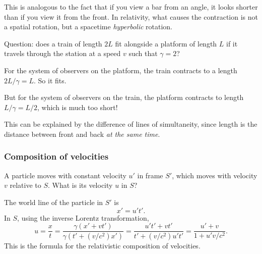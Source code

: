 \documentclass[a4paper]{article}
\begin{document}
This is analogous to the fact that if you view a bar from an angle, it looks shorter than if you view it from the front. In relativity, what causes the contraction is not a spatial rotation, but a spacetime \emph{hyperbolic} rotation.

Question: does a train of length $2L$ fit alongside a platform of length $L$ if it travels through the station at a speed $v$ such that $\gamma = 2$?

For the system of observers on the platform, the train contracts to a length $2L/\gamma = L$. So it fits.

But for the system of observers on the train, the platform contracts to length $L/\gamma = L/2$, which is much too short!

This can be explained by the difference of lines of simultaneity, since length is the distance between front and back \emph{at the same time}.
\begin{center}
\end{center}

\subsubsection*{Composition of velocities}
A particle moves with constant velocity $u'$ in frame $S'$, which moves with velocity $v$ relative to $S$. What is its velocity $u$ in $S$?

The world line of the particle in $S'$ is
\[
  x' = u't'.
\]
In $S$, using the inverse Lorentz transformation,
\[
  u = \frac{x}{t} = \frac{\gamma(x' + vt')}{\gamma(t' + (v/c^2) x')} = \frac{u't' + vt'}{t' + (v/c^2)u't'} = \frac{u' + v}{1 + u'v/c^2}.
\]
This is the formula for the relativistic composition of velocities.
\end{document}
